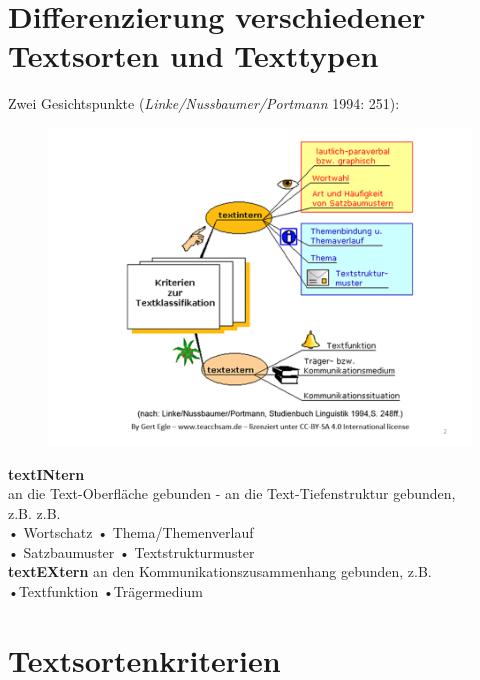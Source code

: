 \documentclass[
  letterpaper,
]{scrbook}
\begin{document}
\hypertarget{differenzierung-verschiedener-textsorten-und-texttypen}{%
\section{Differenzierung verschiedener Textsorten und
Texttypen}\label{differenzierung-verschiedener-textsorten-und-texttypen}}

Zwei Gesichtspunkte (\emph{Linke/Nussbaumer/Portmann} 1994: 251):\\

\begin{figure}

{\centering 

\href{http://teachsam.de/deutsch/d_lingu/txtlin/txtsort_1.htm}{\includegraphics[width=1\textwidth,height=\textheight]{./pictures/textfunktionen_dia_2_int_ext_klassen.PNG}}

}

\end{figure}

\textbf{textINtern}\\
an die Text-Oberfläche gebunden - an die Text-Tiefenstruktur gebunden,\\
z.B. z.B.\\
• Wortschatz • Thema/Themenverlauf\\
• Satzbaumuster • Textstrukturmuster\\

\textbf{textEXtern} an den Kommunikationszusammenhang gebunden, z.B.
•Textfunktion •Trägermedium

\hypertarget{textsortenkriterien}{%
\section{Textsortenkriterien}\label{textsortenkriterien}}
\end{document}
